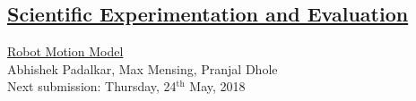 \documentclass[11pt,a4paper,openright,twoside]{extreport}
\begin{document}
\begin{center}
\section*{\underline{Scientific Experimentation and Evaluation}}
\large{\underline{Robot Motion Model}}\\
\large{Abhishek Padalkar, Max Mensing, Pranjal Dhole}\\
\large{Next submission: Thursday, 24$^{\text{th}}$ May, 2018}
\end{center}





\end{document}
